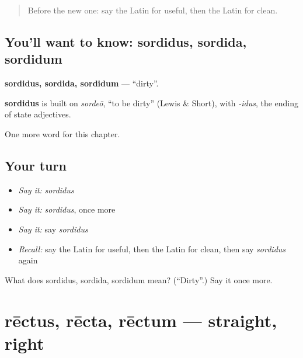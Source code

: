 \label{lesson:LA-C146-sordidus}



\begin{quote}
Before the new one: say the Latin for useful, then the Latin for clean.
\end{quote}

\subsection*{You'll want to know: sordidus, sordida, sordidum}
\textbf{sordidus, sordida, sordidum} — \textquotedblleft{}dirty\textquotedblright{}.

\begin{cousinweb}
\textbf{sordidus} is built on \emph{sordeō}, \textquotedblleft{}to be dirty\textquotedblright{} (Lewis \& Short), with \emph{-idus}, the ending of state adjectives.
\end{cousinweb}

\begin{grammarlens}[title={What you've built}]
One more word for this chapter.
\end{grammarlens}

\subsection*{Your turn}
\begin{itemize}
\raggedright
  \item \emph{Say it:} \emph{sordidus}
  \item \emph{Say it:} \emph{sordidus}, once more
  \item \emph{Say it:} say \emph{sordidus}
  \item \emph{Recall:} say the Latin for useful, then the Latin for clean, then say \emph{sordidus} again
\end{itemize}

\begin{tcolorbox}[breakable,colback=teal!4,colframe=teal!35!black,title={Before you move on}]
What does sordidus, sordida, sordidum mean? (\textquotedblleft{}Dirty\textquotedblright{}.) Say it once more.
\end{tcolorbox}
\section[rēctus, rēcta, rēctum]{rēctus, rēcta, rēctum — straight, right}

\label{lesson:LA-C146-rectus}



